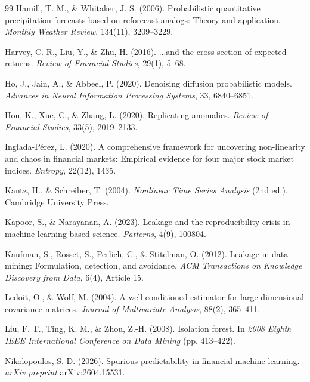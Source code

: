 \documentclass[preprint,12pt]{elsarticle}
\begin{document}
\begin{thebibliography}{99}
 Hamill, T. M., \& Whitaker, J. S. (2006). Probabilistic quantitative precipitation forecasts based on reforecast analogs: Theory and application. \emph{Monthly Weather Review}, 134(11), 3209--3229.

 Harvey, C. R., Liu, Y., \& Zhu, H. (2016). ...and the cross-section of expected returns. \emph{Review of Financial Studies}, 29(1), 5--68.

 Ho, J., Jain, A., \& Abbeel, P. (2020). Denoising diffusion probabilistic models. \emph{Advances in Neural Information Processing Systems}, 33, 6840--6851.

 Hou, K., Xue, C., \& Zhang, L. (2020). Replicating anomalies. \emph{Review of Financial Studies}, 33(5), 2019--2133.

 Inglada-P\'{e}rez, L. (2020). A comprehensive framework for uncovering non-linearity and chaos in financial markets: Empirical evidence for four major stock market indices. \emph{Entropy}, 22(12), 1435.

 Kantz, H., \& Schreiber, T. (2004). \emph{Nonlinear Time Series Analysis} (2nd ed.). Cambridge University Press.

 Kapoor, S., \& Narayanan, A. (2023). Leakage and the reproducibility crisis in machine-learning-based science. \emph{Patterns}, 4(9), 100804.

 Kaufman, S., Rosset, S., Perlich, C., \& Stitelman, O. (2012). Leakage in data mining: Formulation, detection, and avoidance. \emph{ACM Transactions on Knowledge Discovery from Data}, 6(4), Article 15.

 Ledoit, O., \& Wolf, M. (2004). A well-conditioned estimator for large-dimensional covariance matrices. \emph{Journal of Multivariate Analysis}, 88(2), 365--411.

 Liu, F. T., Ting, K. M., \& Zhou, Z.-H. (2008). Isolation forest. In \emph{2008 Eighth IEEE International Conference on Data Mining} (pp. 413--422).

 Nikolopoulos, S. D. (2026). Spurious predictability in financial machine learning. \emph{arXiv preprint} arXiv:2604.15531.


\end{thebibliography}
\end{document}
